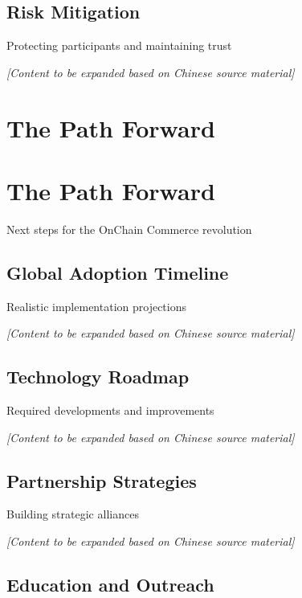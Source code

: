 \documentclass[
  Letterpaper,
]{scrbook}
\begin{document}
\section{Risk Mitigation}\label{risk-mitigation-1}

Protecting participants and maintaining trust

\emph{{[}Content to be expanded based on Chinese source material{]}}

\chapter{The Path Forward}\label{the-path-forward}

\chapter{The Path Forward}\label{sec-path-forward}

Next steps for the OnChain Commerce revolution

\section{Global Adoption Timeline}\label{global-adoption-timeline}

Realistic implementation projections

\emph{{[}Content to be expanded based on Chinese source material{]}}

\section{Technology Roadmap}\label{technology-roadmap}

Required developments and improvements

\emph{{[}Content to be expanded based on Chinese source material{]}}

\section{Partnership Strategies}\label{partnership-strategies}

Building strategic alliances

\emph{{[}Content to be expanded based on Chinese source material{]}}

\section{Education and Outreach}\label{education-and-outreach}
\end{document}
